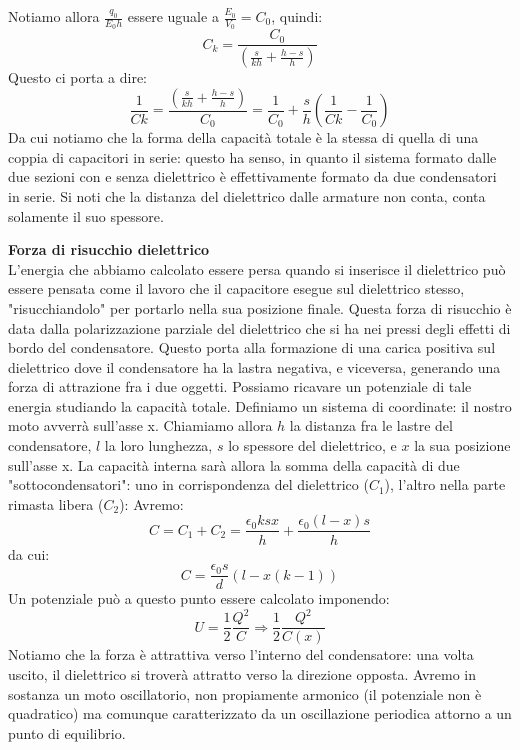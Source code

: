 \documentclass[a4paper,12pt]{article}
\begin{document}
Notiamo allora $\frac{q_0}{E_0h}$ essere uguale a $\frac{E_0}{V_0} = C_0$, quindi:
$$ C_k = \frac{C_0}{\left(\frac{s}{kh} + \frac{h - s}{h}\right)}$$
Questo ci porta a dire:
$$ \frac{1}{Ck} = \frac{\left(\frac{s}{kh} + \frac{h - s}{h}\right)}{C_0} = \frac{1}{C_0} + \frac{s}{h}\left(\frac{1}{Ck} - \frac{1}{C_0}\right)$$
Da cui notiamo che la forma della capacità totale è la stessa di quella di una coppia di capacitori in serie: questo ha senso, in quanto il sistema formato dalle due sezioni con e senza dielettrico è effettivamente
formato da due condensatori in serie. Si noti che la distanza del dielettrico dalle armature non conta, conta solamente il suo spessore.
\par\smallskip
\textbf{Forza di risucchio dielettrico} \\
L'energia che abbiamo calcolato essere persa quando si inserisce il dielettrico può essere pensata come il lavoro che il capacitore esegue sul dielettrico stesso, "risucchiandolo" per portarlo nella sua posizione finale.
Questa forza di risucchio è data dalla polarizzazione parziale del dielettrico che si ha nei pressi degli effetti di bordo del condensatore. Questo porta alla formazione di una carica positiva sul dielettrico dove il condensatore
ha la lastra negativa, e viceversa, generando una forza di attrazione fra i due oggetti. Possiamo ricavare un potenziale di tale energia studiando la capacità totale. Definiamo un sistema di coordinate: il nostro moto avverrà
sull'asse x. Chiamiamo allora $h$ la distanza fra le lastre del condensatore, $l$ la loro lunghezza, $s$ lo spessore del dielettrico, e $x$ la sua posizione sull'asse x. La capacità interna sarà allora la somma della capacità
di due "sottocondensatori": uno in corrispondenza del dielettrico ($C_1$), l'altro nella parte rimasta libera ($C_2$):
Avremo:
$$C = C_1+C_2 = \frac{\epsilon_0 k s x}{h} + \frac{\epsilon_0(l -x)s}{h} $$
da cui:
$$ C = \frac{\epsilon_0 s}{d}\left( l -x (k - 1) \right) $$
Un potenziale può a questo punto essere calcolato imponendo:
$$ U = \frac{1}{2} \frac{Q^2}{C} \Rightarrow \frac{1}{2} \frac{Q^2}{C(x)} $$
Notiamo che la forza è attrattiva verso l'interno del condensatore: una volta uscito, il dielettrico si troverà attratto verso la direzione opposta. Avremo in sostanza un moto oscillatorio, non propiamente armonico (il potenziale
non è quadratico) ma comunque caratterizzato da un oscillazione periodica attorno a un punto di equilibrio.
\end{document}
